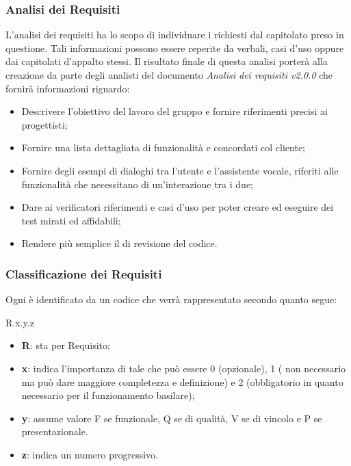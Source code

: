 \subsubsection{Analisi dei Requisiti}
L’analisi dei requisiti ha lo scopo di individuare i  richiesti dal capitolato preso in questione. Tali informazioni possono essere reperite da verbali, casi d’uso oppure dai capitolati d’appalto stessi. Il risultato finale di questa analisi porterà alla creazione da parte degli analisti del documento \emph{Analisi dei requisiti v2.0.0} che fornirà informazioni riguardo:
\begin{itemize}
	\item Descrivere l’obiettivo del lavoro del gruppo e fornire riferimenti precisi ai progettisti;
	\item Fornire una lista dettagliata di funzionalità e  concordati col  cliente;
	\item Fornire degli esempi di dialoghi tra l'utente e l'assistente vocale, riferiti alle funzionalità che necessitano di un'interazione tra i due;
	\item Dare ai verificatori riferimenti e casi d’uso per poter creare ed eseguire dei test mirati ed affidabili;
	\item Rendere più semplice il  di revisione del codice.
\end{itemize}
\subsubsection{Classificazione dei Requisiti}
Ogni  è identificato da un codice che verrà rappresentato secondo quanto segue:
\begin{center}
	R.{x}.{y}.{z}
\end{center}
\begin{itemize}
	\item \textbf{R}: sta per Requisito;
	\item \textbf{x}: indica l’importanza di tale  che può essere 0 (opzionale), 1 ( non necessario ma può dare maggiore completezza e definizione) e 2 (obbligatorio in quanto necessario per il funzionamento basilare);
	\item \textbf{y}: assume valore F se  funzionale, Q se di qualità, V se di vincolo e P se presentazionale.
	\item \textbf{z}: indica un numero progressivo.
\end{itemize}
